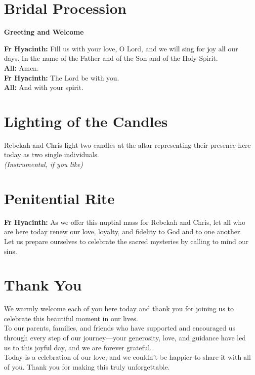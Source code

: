 \documentclass[12pt,landscape]{article}
\begin{document}
\newpage
\begin{multicols}{2}

\section*{Bridal Procession}

\textbf{Greeting and Welcome}

\textbf{Fr Hyacinth:} Fill us with your love, O Lord, and we will sing for joy all our days. In the name of the Father and of the Son and of the Holy Spirit.\\[0.5em]
\textbf{All:} Amen.\\[1em]

\textbf{Fr Hyacinth:} The Lord be with you.\\
\textbf{All:} And with your spirit.\\[1em]

\section*{Lighting of the Candles}

Rebekah and Chris light two candles at the altar representing their presence here today as two single individuals.\\[0.5em]
\textit{(Instrumental, if you like)}\\[1em]

\section*{Penitential Rite}

\textbf{Fr Hyacinth:} As we offer this nuptial mass for Rebekah and Chris, let all who are here today renew our love, loyalty, and fidelity to God and to one another. Let us prepare ourselves to celebrate the sacred mysteries by calling to mind our sins.

\vspace{1em}

\section*{Thank You}

We warmly welcome each of you here today and thank you for joining us to celebrate this beautiful moment in our lives.\\[0.5em]
To our parents, families, and friends who have supported and encouraged us through every step of our journey—your generosity, love, and guidance have led us to this joyful day, and we are forever grateful.\\[0.5em]
Today is a celebration of our love, and we couldn't be happier to share it with all of you. Thank you for making this truly unforgettable.

\columnbreak

\end{multicols}
\end{document}
